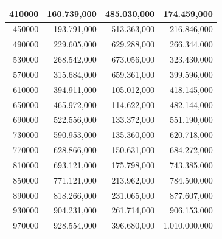 \documentclass[a4paper, 12pt]{article}
\begin{document}
\begin{longtable}[c]{rrrr}
	\multicolumn{1}{|r|}{410000}                  & \multicolumn{1}{r|}{160.739,000}       & \multicolumn{1}{r|}{485.030,000}       & \multicolumn{1}{r|}{174.459,000}    \\ \hline
	\multicolumn{1}{|r|}{450000}                  & \multicolumn{1}{r|}{193.791,000}       & \multicolumn{1}{r|}{513.363,000}       & \multicolumn{1}{r|}{216.846,000}    \\ \hline
	\multicolumn{1}{|r|}{490000}                  & \multicolumn{1}{r|}{229.605,000}       & \multicolumn{1}{r|}{629.288,000}       & \multicolumn{1}{r|}{266.344,000}    \\ \hline
	\multicolumn{1}{|r|}{530000}                  & \multicolumn{1}{r|}{268.542,000}       & \multicolumn{1}{r|}{673.056,000}       & \multicolumn{1}{r|}{323.430,000}    \\ \hline
	\multicolumn{1}{|r|}{570000}                  & \multicolumn{1}{r|}{315.684,000}       & \multicolumn{1}{r|}{659.361,000}       & \multicolumn{1}{r|}{399.596,000}    \\ \hline
	\multicolumn{1}{|r|}{610000}                  & \multicolumn{1}{r|}{394.911,000}       & \multicolumn{1}{r|}{105.012,000}       & \multicolumn{1}{r|}{418.145,000}    \\ \hline
	\multicolumn{1}{|r|}{650000}                  & \multicolumn{1}{r|}{465.972,000}       & \multicolumn{1}{r|}{114.622,000}       & \multicolumn{1}{r|}{482.144,000}    \\ \hline
	\multicolumn{1}{|r|}{690000}                  & \multicolumn{1}{r|}{522.556,000}       & \multicolumn{1}{r|}{133.372,000}       & \multicolumn{1}{r|}{551.190,000}    \\ \hline
	\multicolumn{1}{|r|}{730000}                  & \multicolumn{1}{r|}{590.953,000}       & \multicolumn{1}{r|}{135.360,000}       & \multicolumn{1}{r|}{620.718,000}    \\ \hline
	\multicolumn{1}{|r|}{770000}                  & \multicolumn{1}{r|}{628.866,000}       & \multicolumn{1}{r|}{150.631,000}       & \multicolumn{1}{r|}{684.272,000}    \\ \hline
	\multicolumn{1}{|r|}{810000}                  & \multicolumn{1}{r|}{693.121,000}       & \multicolumn{1}{r|}{175.798,000}       & \multicolumn{1}{r|}{743.385,000}    \\ \hline
	\multicolumn{1}{|r|}{850000}                  & \multicolumn{1}{r|}{771.121,000}       & \multicolumn{1}{r|}{213.962,000}       & \multicolumn{1}{r|}{784.500,000}    \\ \hline
	\multicolumn{1}{|r|}{890000}                  & \multicolumn{1}{r|}{818.266,000}       & \multicolumn{1}{r|}{231.065,000}       & \multicolumn{1}{r|}{877.607,000}    \\ \hline
	\multicolumn{1}{|r|}{930000}                  & \multicolumn{1}{r|}{904.231,000}       & \multicolumn{1}{r|}{261.714,000}       & \multicolumn{1}{r|}{906.153,000}    \\ \hline
	\multicolumn{1}{|r|}{970000}                  & \multicolumn{1}{r|}{928.554,000}       & \multicolumn{1}{r|}{396.680,000}       & \multicolumn{1}{r|}{1.010.000,000}  \\ \hline
\end{longtable}
\end{document}
